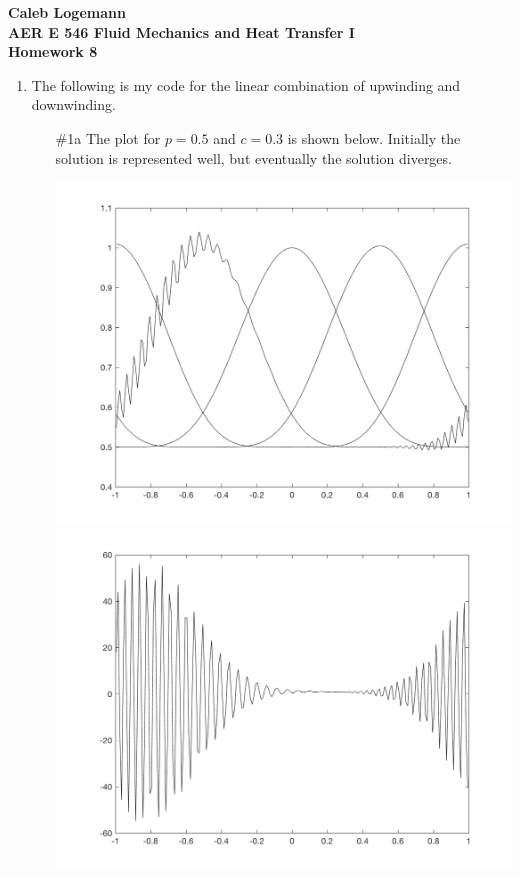 \documentclass[11pt, oneside]{article}
\begin{document}
\noindent \textbf{\Large{Caleb Logemann \\
AER E 546 Fluid Mechanics and Heat Transfer I \\
Homework 8
}}

%
\begin{enumerate}
  \item %
    The following is my code for the linear combination of upwinding and downwinding.
    

    \begin{enumerate}
      \item[\#1a]
        The plot for $p = 0.5$ and $c = 0.3$ is shown below.
        Initially the solution is represented well, but eventually the solution diverges.
        \begin{center}
          \includegraphics[scale=0.5]{Figures/08_01.png}
          \includegraphics[scale=0.5]{Figures/08_02.png}
        \end{center}


\end{enumerate}
\end{enumerate}
\end{document}
